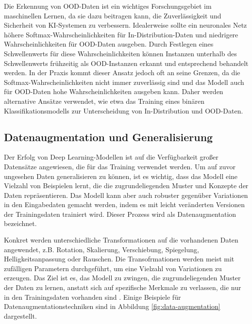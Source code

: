 Die Erkennung von OOD-Daten ist ein wichtiges Forschungsgebiet im maschinellen Lernen, da sie dazu beitragen kann, die Zuverlässigkeit und Sicherheit von KI-Systemen zu verbessern. Idealerweise sollte ein neuronales Netz höhere Softmax-Wahrscheinlichkeiten für In-Distribution-Daten und niedrigere Wahrscheinlichkeiten für OOD-Daten ausgeben. Durch Festlegen eines Schwellenwerts für diese Wahrscheinlichkeiten können Instanzen unterhalb des Schwellenwerts frühzeitig als OOD-Instanzen erkannt und entsprechend behandelt werden. In der Praxis kommt dieser Ansatz jedoch oft an seine Grenzen, da die Softmax-Wahrscheinlichkeiten nicht immer zuverlässig sind und das Modell auch für OOD-Daten hohe Wahrscheinlichkeiten ausgeben kann. Daher werden alternative Ansätze verwendet, wie etwa das Training eines binären Klassifikationsmodells zur Unterscheidung von In-Distribution und OOD-Daten.

\subsection{Datenaugmentation und Generalisierung} \label{sec:data-augmentation}

Der Erfolg von Deep Learning-Modellen ist auf die Verfügbarkeit großer Datensätze angewiesen, die für das Training verwendet werden. Um auf zuvor ungesehen Daten generalisieren zu können, ist es wichtig, dass das Modell eine Vielzahl von Beispielen lernt, die die zugrundeliegenden Muster und Konzepte der Daten repräsentieren. Das Modell kann aber auch robuster gegenüber Variationen in den Eingabedaten gemacht werden, indem es mit leicht veränderten Versionen der Trainingsdaten trainiert wird. Dieser Prozess wird als Datenaugmentation bezeichnet.

Konkret werden unterschiedliche Transformationen auf die vorhandenen Daten angewendet, z.B. Rotation, Skalierung, Verschiebung, Spiegelung, Helligkeitsanpassung oder Rauschen. Die Transofrmationen werden meist mit zufälligen Parametern durchgeführt, um eine Vielzahl von Variationen zu erzeugen. Das Ziel ist es, das Modell zu zwingen, die zugrundeliegenden Muster der Daten zu lernen, anstatt sich auf spezifische Merkmale zu verlassen, die nur in den Trainingsdaten vorhanden sind \parencite{}. Einige Beispiele für Datenaugmentationstechniken sind in Abbildung \ref{fig:data-augmentation} dargestellt. %

